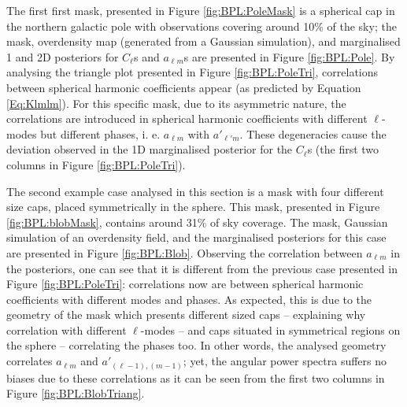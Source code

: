 \qquad The first first mask, presented in Figure \ref{fig:BPL:PoleMask} is a spherical cap in the northern galactic pole with observations covering around 10\% of the sky; the mask, overdensity map (generated from a Gaussian simulation), and marginalised 1 and 2D posteriors for $C_{\ell}$s and $a_{\ell m}$s are presented in Figure \ref{fig:BPL:Pole}. By analysing the triangle plot presented in Figure \ref{fig:BPL:PoleTri}, correlations between spherical harmonic coefficients appear (as predicted by Equation \ref{Eq:Klmlm}). For this specific mask, due to its asymmetric nature, the correlations are introduced in spherical harmonic coefficients with different $\ell$-modes but different phases, i. e. $a_{\ell m}$ with $a'_{\ell' m}$. These degeneracies cause the deviation observed in the 1D marginalised posterior for the $C_{\ell}$s (the first two columns in Figure \ref{fig:BPL:PoleTri}).

\qquad The second example case analysed in this section is a mask with four different size caps, placed symmetrically in the sphere. This mask, presented in Figure \ref{fig:BPL:blobMask}, contains around 31\% of sky coverage. The mask, Gaussian simulation of an overdensity field, and the marginalised posteriors for this case are presented in Figure \ref{fig:BPL:Blob}. Observing the correlation between $a_{\ell m}$ in the posteriors, one can see that it is different from the previous case presented in Figure \ref{fig:BPL:PoleTri}: correlations now are between spherical harmonic coefficients with different modes and phases. As expected, this is due to the geometry of the mask which presents different sized caps -- explaining why correlation with different $\ell$-modes -- and caps situated in symmetrical regions on the sphere -- correlating the phases too. In other words, the analysed geometry correlates $a_{\ell m}$ and $a'_{(\ell-1),(m-1)}$; yet, the angular power spectra suffers no biases due to these correlations as it can be seen from the first two columns in Figure \ref{fig:BPL:BlobTriang}.

